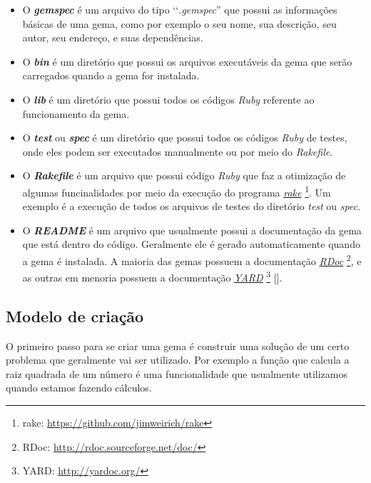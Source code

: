 \begin{itemize}

 \item O \emph{\textbf{gemspec}} é um arquivo do tipo ‘‘\emph{.gemspec}'' que possui as informações básicas 
 de uma gema, como por exemplo o seu nome, sua descrição, seu autor, seu endereço, e suas dependências.

 \item O \emph{\textbf{bin}} é um diretório que possui os arquivos executáveis da gema que serão 
 carregados quando a gema for instalada.

 \item O \emph{\textbf{lib}} é um diretório que possui todos os códigos \emph{Ruby} referente ao 
 funcionamento da gema.

 \item O \emph{\textbf{test}} ou \emph{\textbf{spec}} é um diretório que possui todos os códigos \emph{Ruby} 
 de testes, onde eles podem ser executados manualmente ou por meio do \emph{Rakefile}.

 \item O \emph{\textbf{Rakefile}} é um arquivo que possui código \emph{Ruby} que faz a otimização de algumas
 funcinalidades por meio da execução do programa \emph{\href{https://github.com/jimweirich/rake}{rake}} 
\footnote{rake: \url{https://github.com/jimweirich/rake}}. Um exemplo é a execução de todos os arquivos 
de testes do diretório \emph{test} ou \emph{spec}.

 \item O \emph{\textbf{README}} é um arquivo que usualmente possui a documentação da gema que está dentro do 
 código. Geralmente ele é gerado automaticamente quando a gema é instalada. A maioria das gemas possuem
 a documentação \emph{\href{http://rdoc.sourceforge.net/doc/}{RDoc}} 
 \footnote{RDoc: \url{http://rdoc.sourceforge.net/doc/}}, e as outras em menoria possuem a documentação 
 \emph{\href{http://yardoc.org/}{YARD}} \footnote{YARD: \url{http://yardoc.org/}} 
 [].

\end{itemize}

\subsection{Modelo de criação}
\label{subsection:modelo_de_criação}

O primeiro passo para se criar uma gema é construir uma solução de um certo problema que geralmente vai
ser utilizado. Por exemplo a função que calcula a raiz quadrada de um número é uma funcionalidade que 
usualmente utilizamos quando estamos fazendo cálculos. 

